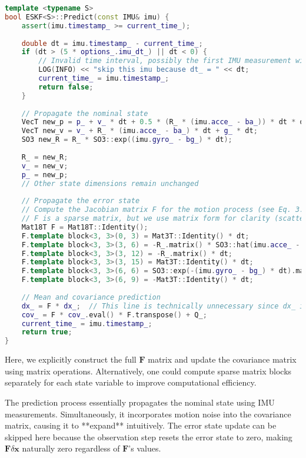 \begin{lstlisting}[language=c++,caption=src/ch3/eskf.hpp]
template <typename S>
bool ESKF<S>::Predict(const IMU& imu) {
	assert(imu.timestamp_ >= current_time_);
	
	double dt = imu.timestamp_ - current_time_;
	if (dt > (5 * options_.imu_dt_) || dt < 0) {
		// Invalid time interval, possibly the first IMU measurement with no prior information
		LOG(INFO) << "skip this imu because dt_ = " << dt;
		current_time_ = imu.timestamp_;
		return false;
	}
	
	// Propagate the nominal state
	VecT new_p = p_ + v_ * dt + 0.5 * (R_ * (imu.acce_ - ba_)) * dt * dt + 0.5 * g_ * dt * dt;
	VecT new_v = v_ + R_ * (imu.acce_ - ba_) * dt + g_ * dt;
	SO3 new_R = R_ * SO3::exp((imu.gyro_ - bg_) * dt);
	
	R_ = new_R;
	v_ = new_v;
	p_ = new_p;
	// Other state dimensions remain unchanged
	
	// Propagate the error state
	// Compute the Jacobian matrix F for the motion process (see Eq. 3.47)
	// F is a sparse matrix, but we use matrix form for clarity (scattered computation is also possible for efficiency)
	Mat18T F = Mat18T::Identity();                                                 // Main diagonal
	F.template block<3, 3>(0, 3) = Mat3T::Identity() * dt;                         // p wrt v
	F.template block<3, 3>(3, 6) = -R_.matrix() * SO3::hat(imu.acce_ - ba_) * dt;  // v wrt theta
	F.template block<3, 3>(3, 12) = -R_.matrix() * dt;                             // v wrt ba
	F.template block<3, 3>(3, 15) = Mat3T::Identity() * dt;                        // v wrt g
	F.template block<3, 3>(6, 6) = SO3::exp(-(imu.gyro_ - bg_) * dt).matrix();     // theta wrt theta
	F.template block<3, 3>(6, 9) = -Mat3T::Identity() * dt;                        // theta wrt bg
	
	// Mean and covariance prediction
	dx_ = F * dx_;  // This line is technically unnecessary since dx_ is reset to zero after updates, but F is needed for covariance propagation
	cov_ = F * cov_.eval() * F.transpose() + Q_;
	current_time_ = imu.timestamp_;
	return true;
}
\end{lstlisting}  

Here, we explicitly construct the full $\mathbf{F}$ matrix and update the covariance matrix using matrix operations. Alternatively, one could compute sparse matrix blocks separately for each state variable to improve computational efficiency.  

The prediction process essentially propagates the nominal state using IMU measurements. Simultaneously, it incorporates motion noise into the covariance matrix, causing it to **expand** intuitively. The error state update can be skipped here because the observation step resets the error state to zero, making $\mathbf{F} \delta \mathbf{x}$ naturally zero regardless of $\mathbf{F}$'s values.  

